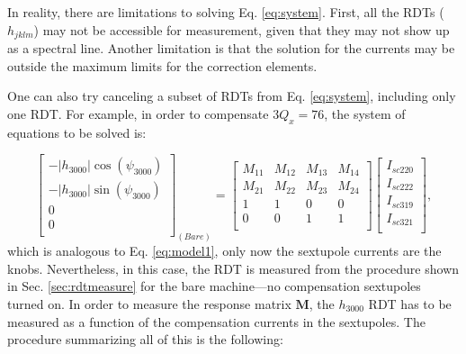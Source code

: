 In reality, there are limitations to solving Eq. \ref{eq:system}. First, all the RDTs ($h_{jklm}$) may not be accessible for measurement, given that they may not show up as a spectral line. Another limitation is that the solution for the currents may be outside the maximum limits for the correction elements. 

One can also try canceling a subset of RDTs from Eq. \ref{eq:system}, including only one RDT. For example, in order to compensate $3 Q_x=76$, the system of equations to be solved is:

\begin{equation}
    \begin{bmatrix}
        -|{h_{3000}}|  \cos (\psi_{3000})\\
        -|{h_{3000}}|  \sin (\psi_{3000})\\
        0\\
        0\\
      \end{bmatrix}_{(Bare)}
    =
    \begin{bmatrix}
        M_{11} & M_{12} & M_{13} & M_{14} \\
        M_{21} & M_{22} & M_{23} & M_{24} \\
        1 & 1 & 0 & 0 \\
        0 & 0 & 1 & 1 \\
    \end{bmatrix}
    \begin{bmatrix}
        I_{sc220} \\
        I_{sc222} \\
        I_{sc319} \\
        I_{sc321} \\
      \end{bmatrix},
    \label{eq:system1}
\end{equation}
which is analogous to Eq. \ref{eq:model1}, only now the sextupole currents are the knobs. Nevertheless, in this case, the RDT is measured from the procedure shown in Sec. \ref{sec:rdtmeasure} for the bare machine---no compensation sextupoles turned on. In order to measure the response matrix $\boldsymbol{M}$, the $h_{3000}$ RDT has to be measured as a function of the compensation currents in the sextupoles. The procedure summarizing all of this is the following:
